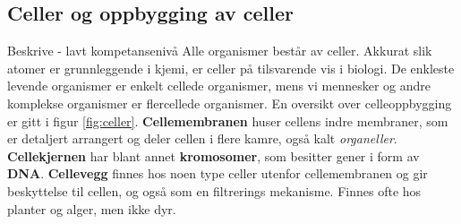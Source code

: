 \documentclass[main.tex]{subfiles}
\begin{document}
\subsection{Celler og oppbygging av celler}
{\color{PineGreen}Beskrive - lavt kompetansenivå}
\newline\newline
Alle organismer består av celler. Akkurat slik atomer er grunnleggende i kjemi, er celler på tilsvarende vis i biologi. De enkleste levende organismer er enkelt cellede organismer, mens vi mennesker og andre komplekse organismer er flercellede organismer. En oversikt over celleoppbygging er gitt i figur \ref{fig:celler}.
\newline\newline
\textbf{Cellemembranen} huser cellens indre membraner, som er detaljert arrangert og deler cellen i flere kamre, også kalt \emph{organeller}.
\newline\newline
\textbf{Cellekjernen} har blant annet \textbf{kromosomer}, som besitter gener i form av \textbf{DNA}.
\newline\newline
\textbf{Cellevegg} finnes hos noen type celler utenfor cellemembranen og gir beskyttelse til cellen, og også som en filtrerings mekanisme. Finnes ofte hos planter og alger, men ikke dyr.
\end{document}
